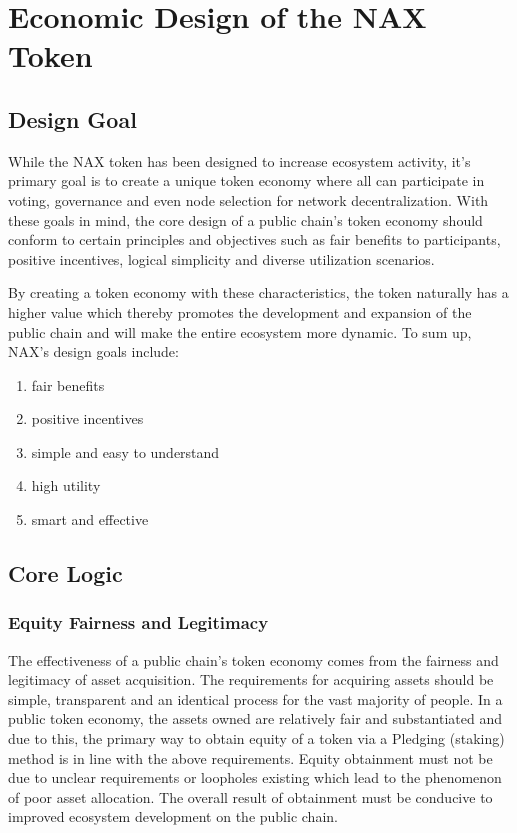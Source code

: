 \section{Economic Design of the NAX Token}
\subsection{Design Goal}
While the NAX token has been designed to increase ecosystem activity, it's primary goal is to create a unique token economy where all can participate in voting, governance and even node selection for network decentralization. With these goals in mind, the core design of a public chain's token economy should conform to certain principles and objectives such as fair benefits to participants, positive incentives, logical simplicity and diverse utilization scenarios. 

By creating a token economy with these characteristics, the token naturally has a higher value which thereby promotes the development and expansion of the public chain and will make the entire ecosystem more dynamic. To sum up, NAX's design goals include:

\begin{enumerate}[\hspace{2cm}(a)]
    \item fair benefits
    \item positive incentives
    \item simple and easy to understand
    \item high utility
    \item smart and effective
\end{enumerate}

\subsection{Core Logic}

\subsubsection{Equity Fairness and Legitimacy}
The effectiveness of a public chain's token economy comes from the fairness and legitimacy of asset acquisition. The requirements for acquiring assets should be simple, transparent and an identical process for the vast majority of people. In a public token economy, the assets owned are relatively fair and substantiated and due to this, the primary way to obtain equity of a token via a Pledging (staking) method is in line with the above requirements. Equity obtainment must not be due to unclear requirements or loopholes existing which lead to the phenomenon of poor asset allocation. The overall result of obtainment must be conducive to improved ecosystem development on the public chain.

